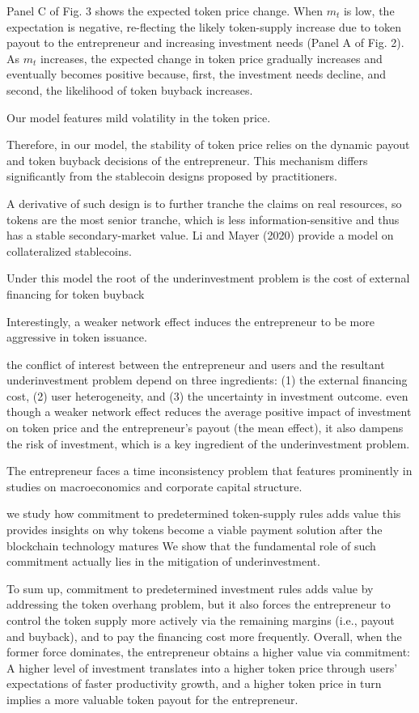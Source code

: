 {Panel C of Fig. 3 shows the expected token price change. When $m_t$ is low, the expectation is negative, re-flecting the likely token-supply increase due to token payout to the entrepreneur and increasing investment needs (Panel A of Fig. 2). As $m_t$ increases, the expected change in token price gradually increases and eventually becomes positive because, first, the investment needs decline, and second, the likelihood of token buyback increases.

Our model features mild volatility in the token price.

Therefore, in our model, the stability of token price relies on the dynamic payout and token buyback decisions of the entrepreneur. This mechanism differs significantly from the stablecoin designs proposed by practitioners.

A derivative of such design is to further tranche the claims on real resources, so tokens are the most senior tranche, which is less information-sensitive and thus has a stable secondary-market value. Li and Mayer (2020) provide a model on collateralized stablecoins.

Under this model the root of the underinvestment problem is the cost of external financing for token buyback

Interestingly, a weaker network effect induces the entrepreneur to be more aggressive in token issuance.

the conflict of interest between the entrepreneur and users and the resultant underinvestment problem depend on three ingredients: (1) the external financing cost, (2) user heterogeneity, and (3) the uncertainty in investment outcome. even though a weaker network effect reduces the average positive impact of investment on token price and the entrepreneur's payout (the mean effect), it also dampens the risk of investment, which is a key ingredient of the underinvestment problem.

The entrepreneur faces a time inconsistency problem that features prominently in studies on macroeconomics and corporate capital structure.

we study how commitment to predetermined token-supply rules adds value this provides insights on why tokens become a viable payment solution after the blockchain technology matures We show that the fundamental role of such commitment actually lies in the mitigation of underinvestment.

To sum up, commitment to predetermined investment rules adds value by addressing the token overhang problem, but it also forces the entrepreneur to control the token supply more actively via the remaining margins (i.e., payout and buyback), and to pay the financing cost more frequently. Overall, when the former force dominates, the entrepreneur obtains a higher value via commitment: A higher level of investment translates into a higher token price through users' expectations of faster productivity growth, and a higher token price in turn implies a more valuable token payout for the entrepreneur.

}
